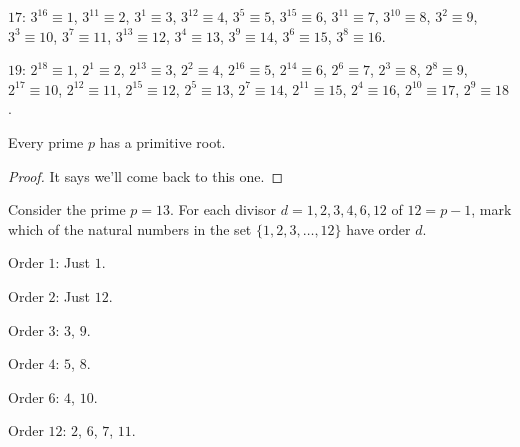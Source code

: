 \documentclass[../main.tex]{subfiles}
\begin{document}
$17$: $3^{16} \equiv 1$, $3^{11} \equiv 2$, $3^1 \equiv 3$, $3^{12} \equiv 4$, $3^5 \equiv 5$, $3^{15} \equiv 6$, $3^{11} \equiv 7$, $3^{10} \equiv 8$,
$3^2 \equiv 9$, $3^3 \equiv 10$, $3^7 \equiv 11$, $3^{13} \equiv 12$, $3^4 \equiv 13$, $3^9 \equiv 14$, $3^6 \equiv 15$, $3^8 \equiv 16$.

$19$: $2^{18} \equiv 1$, $2^1 \equiv 2$, $2^{13} \equiv 3$, $2^2 \equiv 4$, $2^{16} \equiv 5$, $2^{14} \equiv 6$, $2^6 \equiv 7$, $2^3 \equiv 8$,
$2^8 \equiv 9$, $2^{17} \equiv 10$, $2^{12} \equiv 11$, $2^{15} \equiv 12$, $2^5 \equiv 13$, $2^7 \equiv 14$, $2^{11} \equiv 15$, $2^4 \equiv 16$,
$2^{10} \equiv 17$, $2^9 \equiv 18$.



\begin{thm} \label{6.8}
  Every prime $p$ has a primitive root.
\end{thm}

\begin{proof}
  It says we'll come back to this one.
\end{proof}



\begin{ex} \label{6.9}
  Consider the prime $p = 13$. For each divisor $d = 1, 2, 3, 4, 6, 12$ of $12 = p-1$, mark which of the natural numbers in the set $\{1, 2, 3, \ldots, 12\}$ have order $d$.
\end{ex}

Order $1$: Just $1$.

Order $2$: Just $12$.

Order $3$: $3$, $9$.

Order $4$: $5$, $8$.

Order $6$: $4$, $10$.

Order $12$: $2$, $6$, $7$, $11$.
\end{document}
